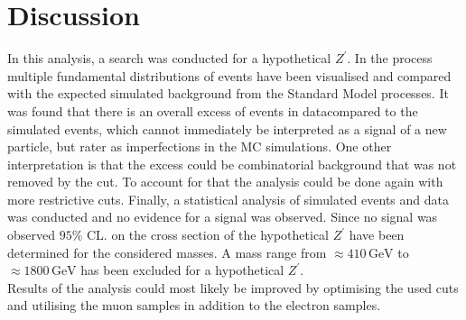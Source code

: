 \section{Discussion}
\label{sec:Diskussion}
In this analysis, a search was conducted for a hypothetical $Z^\prime$. In the process multiple fundamental distributions of events 
have been visualised and compared with the expected simulated background from the Standard Model processes. It was found that 
there is an overall excess of events in datacompared to the simulated events, which cannot immediately be interpreted as a signal of a 
new particle, but rater as imperfections in the MC simulations.
One other interpretation is
that the excess could be combinatorial background that was not removed by the cut. To account for that the analysis could be done again with more restrictive cuts.
Finally, a statistical analysis of 
simulated events and data was conducted and no evidence for a signal was observed. 
Since no signal was observed $95\%$ CL. on the cross section of the hypothetical $Z^\prime$ have been determined for the 
considered masses.
A mass
range from $\approx 410 \, \si{\giga\eV}$ to $\approx 1800 \, \si{\giga\eV}$ has been excluded for a hypothetical $Z^\prime$.\\
Results of the analysis could most likely be improved by optimising the used cuts and utilising the muon samples in addition to the electron samples. \\
